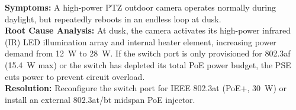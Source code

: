 \begin{tcolorbox}[colback=white,colframe=titleblue,title=\textbf{Scenario 3: Outdoor IP Surveillance Camera Repeatedly Reboots}]
\textbf{Symptoms:} A high-power PTZ outdoor camera operates normally during daylight, but repeatedly reboots in an endless loop at dusk. \\
\textbf{Root Cause Analysis:} At dusk, the camera activates its high-power infrared (IR) LED illumination array and internal heater element, increasing power demand from 12~W to 28~W. If the switch port is only provisioned for 802.3af (15.4~W max) or the switch has depleted its total PoE power budget, the PSE cuts power to prevent circuit overload. \\
\textbf{Resolution:} Reconfigure the switch port for IEEE 802.3at (PoE+, 30~W) or install an external 802.3at/bt midspan PoE injector.
\end{tcolorbox}
